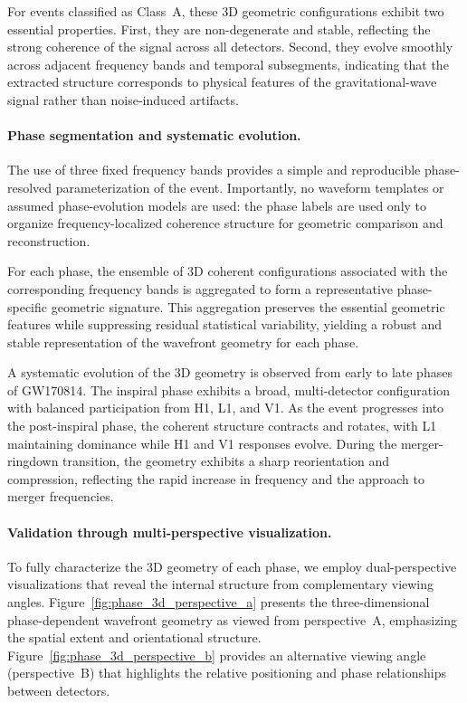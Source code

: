 \documentclass[11pt,a4paper]{article}
\begin{document}
For events classified as Class~A, these 3D geometric configurations exhibit two essential
properties.
First, they are non-degenerate and stable, reflecting the strong coherence of the signal
across all detectors.
Second, they evolve smoothly across adjacent frequency bands and temporal subsegments,
indicating that the extracted structure corresponds to physical features of the
gravitational-wave signal rather than noise-induced artifacts.

\paragraph{Phase segmentation and systematic evolution.}
The use of three fixed frequency bands provides a simple and reproducible phase-resolved
parameterization of the event.
Importantly, no waveform templates or assumed phase-evolution models are used: the phase
labels are used only to organize frequency-localized coherence structure for geometric
comparison and reconstruction.

For each phase, the ensemble of 3D coherent configurations associated with the
corresponding frequency bands is aggregated to form a representative phase-specific
geometric signature.
This aggregation preserves the essential geometric features while suppressing residual
statistical variability, yielding a robust and stable representation of the wavefront
geometry for each phase.

A systematic evolution of the 3D geometry is observed from early to late phases of
GW170814.
The inspiral phase exhibits a broad, multi-detector configuration with balanced
participation from H1, L1, and V1.
As the event progresses into the post-inspiral phase, the coherent structure contracts
and rotates, with L1 maintaining dominance while H1 and V1 responses evolve.
During the merger-ringdown transition, the geometry exhibits a sharp reorientation and
compression, reflecting the rapid increase in frequency and the approach to merger
frequencies.

\paragraph{Validation through multi-perspective visualization.}
To fully characterize the 3D geometry of each phase, we employ dual-perspective
visualizations that reveal the internal structure from complementary viewing angles.
Figure~\ref{fig:phase_3d_perspective_a} presents the three-dimensional phase-dependent
wavefront geometry as viewed from perspective~A, emphasizing the spatial extent and
orientational structure.
Figure~\ref{fig:phase_3d_perspective_b} provides an alternative viewing angle
(perspective~B) that highlights the relative positioning and phase relationships between
detectors.
\end{document}
